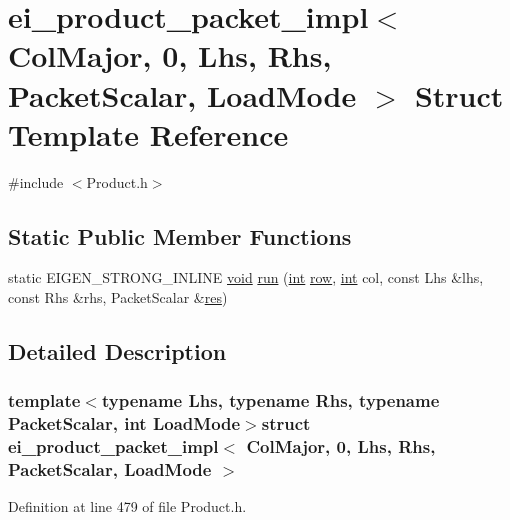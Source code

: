 \hypertarget{structei__product__packet__impl_3_01_col_major_00_010_00_01_lhs_00_01_rhs_00_01_packet_scalar_00_01_load_mode_01_4}{\section{ei\-\_\-product\-\_\-packet\-\_\-impl$<$ Col\-Major, 0, Lhs, Rhs, Packet\-Scalar, Load\-Mode $>$ Struct Template Reference}
\label{structei__product__packet__impl_3_01_col_major_00_010_00_01_lhs_00_01_rhs_00_01_packet_scalar_00_01_load_mode_01_4}
}


{\ttfamily \#include $<$Product.\-h$>$}

\subsection*{Static Public Member Functions}
\begin{DoxyCompactItemize}
\item 
static E\-I\-G\-E\-N\-\_\-\-S\-T\-R\-O\-N\-G\-\_\-\-I\-N\-L\-I\-N\-E \hyperlink{group___u_a_v_objects_plugin_ga444cf2ff3f0ecbe028adce838d373f5c}{void} \hyperlink{structei__product__packet__impl_3_01_col_major_00_010_00_01_lhs_00_01_rhs_00_01_packet_scalar_00_01_load_mode_01_4_ae4f087244241907c1a911af0a360534f}{run} (\hyperlink{ioapi_8h_a787fa3cf048117ba7123753c1e74fcd6}{int} \hyperlink{glext_8h_a11b277b422822f784ee248b43eee3e1e}{row}, \hyperlink{ioapi_8h_a787fa3cf048117ba7123753c1e74fcd6}{int} col, const Lhs \&lhs, const Rhs \&rhs, Packet\-Scalar \&\hyperlink{glext_8h_a1dbb21208b9047cc8031ca9c840d3c2f}{res})
\end{DoxyCompactItemize}


\subsection{Detailed Description}
\subsubsection*{template$<$typename Lhs, typename Rhs, typename Packet\-Scalar, int Load\-Mode$>$struct ei\-\_\-product\-\_\-packet\-\_\-impl$<$ Col\-Major, 0, Lhs, Rhs, Packet\-Scalar, Load\-Mode $>$}



Definition at line 479 of file Product.\-h.



